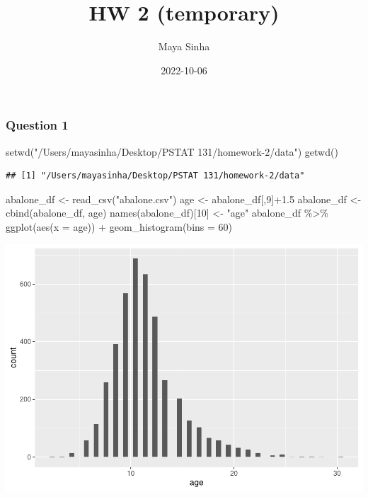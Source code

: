 \documentclass[
]{article}
\title{HW 2 (temporary)}
\author{Maya Sinha}
\date{2022-10-06}
\newenvironment{Shaded}{\begin{snugshade}}{\end{snugshade}}
\newcommand{\AttributeTok}[1]{\textcolor[rgb]{0.77,0.63,0.00}{#1}}
\newcommand{\DecValTok}[1]{\textcolor[rgb]{0.00,0.00,0.81}{#1}}
\newcommand{\FloatTok}[1]{\textcolor[rgb]{0.00,0.00,0.81}{#1}}
\newcommand{\FunctionTok}[1]{\textcolor[rgb]{0.00,0.00,0.00}{#1}}
\newcommand{\NormalTok}[1]{#1}
\newcommand{\OtherTok}[1]{\textcolor[rgb]{0.56,0.35,0.01}{#1}}
\newcommand{\SpecialCharTok}[1]{\textcolor[rgb]{0.00,0.00,0.00}{#1}}
\newcommand{\StringTok}[1]{\textcolor[rgb]{0.31,0.60,0.02}{#1}}
\begin{document}
\maketitle

\hypertarget{question-1}{%
\subsubsection{Question 1}\label{question-1}}

\begin{Shaded}
\begin{Highlighting}[]
\FunctionTok{setwd}\NormalTok{(}\StringTok{"/Users/mayasinha/Desktop/PSTAT 131/homework{-}2/data"}\NormalTok{) }
\FunctionTok{getwd}\NormalTok{()}
\end{Highlighting}
\end{Shaded}

\begin{verbatim}
## [1] "/Users/mayasinha/Desktop/PSTAT 131/homework-2/data"
\end{verbatim}

\begin{Shaded}
\begin{Highlighting}[]
\NormalTok{abalone\_df }\OtherTok{\textless{}{-}} \FunctionTok{read\_csv}\NormalTok{(}\StringTok{"abalone.csv"}\NormalTok{)}
\NormalTok{age }\OtherTok{\textless{}{-}}\NormalTok{ abalone\_df[,}\DecValTok{9}\NormalTok{]}\SpecialCharTok{+}\FloatTok{1.5}
\NormalTok{abalone\_df }\OtherTok{\textless{}{-}} \FunctionTok{cbind}\NormalTok{(abalone\_df, age)}
\FunctionTok{names}\NormalTok{(abalone\_df)[}\DecValTok{10}\NormalTok{] }\OtherTok{\textless{}{-}} \StringTok{"age"}
\NormalTok{abalone\_df }\SpecialCharTok{\%\textgreater{}\%} 
  \FunctionTok{ggplot}\NormalTok{(}\FunctionTok{aes}\NormalTok{(}\AttributeTok{x =}\NormalTok{ age)) }\SpecialCharTok{+}
  \FunctionTok{geom\_histogram}\NormalTok{(}\AttributeTok{bins =} \DecValTok{60}\NormalTok{) }
\end{Highlighting}
\end{Shaded}

\includegraphics{Homework-2_files/figure-latex/unnamed-chunk-2-1.pdf}
\end{document}
